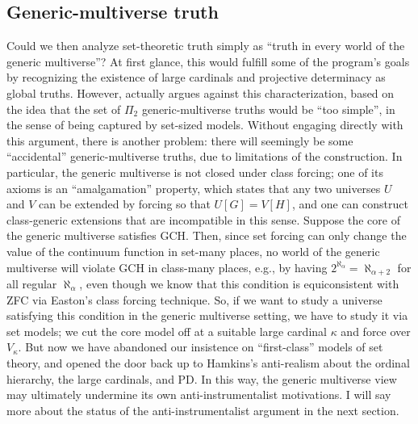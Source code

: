 \documentclass[letterpaper,12pt]{article}
\begin{document}
\subsection{Generic-multiverse truth}
Could we then analyze set-theoretic truth simply as ``truth in every world of the generic multiverse''? At first glance, this would fulfill some of the program's goals by recognizing the existence of large cardinals and projective determinacy as global truths. However, \cite{woodin2009continuum} actually argues against this characterization, based on the idea that the set of $\Pi_2$ generic-multiverse truths would be ``too simple'', in the sense of being captured by set-sized models. Without engaging directly with this argument, there is another problem: there will seemingly be some ``accidental'' generic-multiverse truths, due to limitations of the construction. In particular, the generic multiverse is not closed under class forcing; one of its axioms is an ``amalgamation'' property, which states that any two universes $U$ and $V$ can be extended by forcing so that $U[G] = V[H]$, and one can construct class-generic extensions that are incompatible in this sense. Suppose the core of the generic multiverse satisfies GCH. Then, since set forcing can only change the value of the continuum function in set-many places, no world of the generic multiverse will violate GCH in class-many places, e.g., by having $2^{\aleph_\alpha} = \aleph_{\alpha + 2}$ for all regular $\aleph_\alpha$, even though we know that this condition is equiconsistent with ZFC via Easton's class forcing technique. So, if we want to study a universe satisfying this condition in the generic multiverse setting, we have to study it via set models; we cut the core model off at a suitable large cardinal $\kappa$ and force over $V_\kappa$. But now we have abandoned our insistence on ``first-class'' models of set theory, and opened the door back up to Hamkins's anti-realism about the ordinal hierarchy, the large cardinals, and PD. In this way, the generic multiverse view may ultimately undermine its own anti-instrumentalist motivations. I will say more about the status of the anti-instrumentalist argument in the next section.

\end{document}
